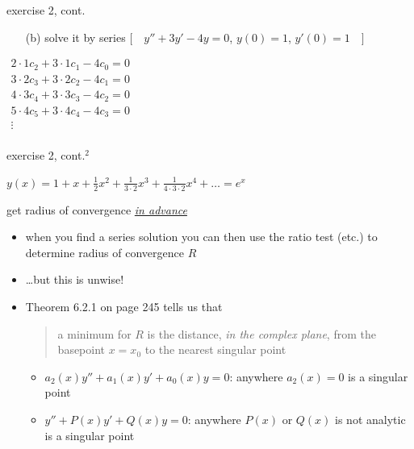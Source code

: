 \documentclass[dvipsnames,colorlinks]{beamer}
\begin{document}
\begin{frame}{exercise 2, cont.}

\begin{itemize}
\item[(b)] solve it by series \hfill \small $\Big[ \quad y''+3y'-4y=0$, $y(0)=1$, $y'(0)=1 \quad \Big]$\normalsize
\end{itemize}

\vspace{45mm}

\hfill \footnotesize $\displaystyle \boxed{\begin{matrix} 2\cdot 1 c_2 + 3 \cdot 1 c_1 - 4 c_0 = 0 \\
                                     3\cdot 2 c_3 + 3 \cdot 2 c_2 - 4 c_1 = 0 \\
                                     4\cdot 3 c_4 + 3 \cdot 3 c_3 - 4 c_2 = 0 \\
                                     5\cdot 4 c_5 + 3 \cdot 4 c_4 - 4 c_3 = 0 \\
                                      \vdots \\
                      \end{matrix}}$
\end{frame}


\begin{frame}{exercise 2, cont.$^2$}

\vspace{60mm}

\footnotesize
\hfill $y(x) = 1 + x + \frac{1}{2} x^2 + \frac{1}{3\cdot 2} x^3 + \frac{1}{4\cdot 3\cdot 2} x^4 + \dots = e^x$
\end{frame}


\begin{frame}{get radius of convergence \underline{\emph{in advance}}}

\begin{itemize}
\item when you find a series solution you can then use the ratio test (etc.) to determine radius of convergence $R$
\item \dots but this is unwise!
\item Theorem 6.2.1 on page 245 tells us that

\medskip
\begin{quote}
\normalfont \alert{a minimum for $R$ is the distance, \emph{in the complex plane}, from the basepoint $x=x_0$ to the nearest singular point}
\end{quote}

    \begin{itemize}
    \item $a_2(x) y''+ a_1(x) y' + a_0(x) y=0$: anywhere $a_2(x)=0$ is a singular point
    \item $y''+P(x)y'+Q(x)y=0$: anywhere $P(x)$ or $Q(x)$ is not analytic is a singular point
    \end{itemize}
\end{itemize}
\end{frame}
\end{document}
